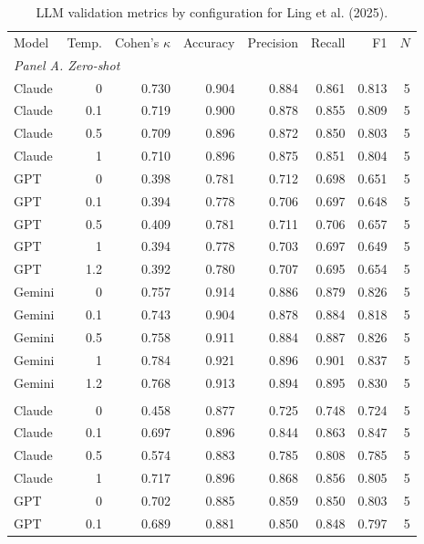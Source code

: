 \begin{table}[htbp]
\centering
\caption{LLM validation metrics by configuration for Ling et al. (2025).}
\label{tab:metrics_under_reporting_Ling_Kale_Imas}
\small
\begin{threeparttable}
\begin{tabular}{lrrrrrrr}
\toprule
Model & Temp. & Cohen's $\kappa$ & Accuracy & Precision & Recall & F1 & $N$
\\
\multicolumn{8}{l}{\textit{Panel A. Zero-shot}} \\
\midrule
Claude & 0 & 0.730 & 0.904 & 0.884 & 0.861 & 0.813 & 5 \\
Claude & 0.1 & 0.719 & 0.900 & 0.878 & 0.855 & 0.809 & 5 \\
Claude & 0.5 & 0.709 & 0.896 & 0.872 & 0.850 & 0.803 & 5 \\
Claude & 1 & 0.710 & 0.896 & 0.875 & 0.851 & 0.804 & 5 \\
GPT & 0 & 0.398 & 0.781 & 0.712 & 0.698 & 0.651 & 5 \\
GPT & 0.1 & 0.394 & 0.778 & 0.706 & 0.697 & 0.648 & 5 \\
GPT & 0.5 & 0.409 & 0.781 & 0.711 & 0.706 & 0.657 & 5 \\
GPT & 1 & 0.394 & 0.778 & 0.703 & 0.697 & 0.649 & 5 \\
GPT & 1.2 & 0.392 & 0.780 & 0.707 & 0.695 & 0.654 & 5 \\
Gemini & 0 & 0.757 & 0.914 & 0.886 & 0.879 & 0.826 & 5 \\
Gemini & 0.1 & 0.743 & 0.904 & 0.878 & 0.884 & 0.818 & 5 \\
Gemini & 0.5 & 0.758 & 0.911 & 0.884 & 0.887 & 0.826 & 5 \\
Gemini & 1 & 0.784 & 0.921 & 0.896 & 0.901 & 0.837 & 5 \\
Gemini & 1.2 & 0.768 & 0.913 & 0.894 & 0.895 & 0.830 & 5 \\
\addlinespace[0.35em]
\multicolumn{8}{l}{\textit{Panel B. Few-shot}} \\
\midrule
Claude & 0 & 0.458 & 0.877 & 0.725 & 0.748 & 0.724 & 5 \\
Claude & 0.1 & 0.697 & 0.896 & 0.844 & 0.863 & 0.847 & 5 \\
Claude & 0.5 & 0.574 & 0.883 & 0.785 & 0.808 & 0.785 & 5 \\
Claude & 1 & 0.717 & 0.896 & 0.868 & 0.856 & 0.805 & 5 \\
GPT & 0 & 0.702 & 0.885 & 0.859 & 0.850 & 0.803 & 5 \\
GPT & 0.1 & 0.689 & 0.881 & 0.850 & 0.848 & 0.797 & 5 \\

\end{tabular}
\end{threeparttable}
\end{table}
